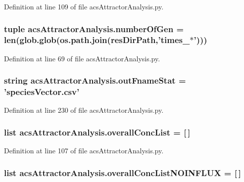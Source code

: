 Definition at line 109 of file acs\-Attractor\-Analysis.\-py.

\hypertarget{a00096_ac014a9b46a060e4fed96eaee9614345b}{
\subsubsection[{number\-Of\-Gen}]{\setlength{\rightskip}{0pt plus 5cm}tuple acs\-Attractor\-Analysis.\-number\-Of\-Gen = len(glob.\-glob(os.\-path.\-join({\bf res\-Dir\-Path},'times\-\_\-$\ast$')))}}\label{a00096_ac014a9b46a060e4fed96eaee9614345b}


Definition at line 69 of file acs\-Attractor\-Analysis.\-py.

\hypertarget{a00096_aeecfcdefbc44b2b2ceff4c9b6f737f27}{
\subsubsection[{out\-Fname\-Stat}]{\setlength{\rightskip}{0pt plus 5cm}string acs\-Attractor\-Analysis.\-out\-Fname\-Stat = 'species\-Vector.\-csv'}}\label{a00096_aeecfcdefbc44b2b2ceff4c9b6f737f27}


Definition at line 230 of file acs\-Attractor\-Analysis.\-py.

\hypertarget{a00096_aca1d14f4dbff06c02b0e3e362c7ffe14}{
\subsubsection[{overall\-Conc\-List}]{\setlength{\rightskip}{0pt plus 5cm}list acs\-Attractor\-Analysis.\-overall\-Conc\-List = \mbox{[}$\,$\mbox{]}}}\label{a00096_aca1d14f4dbff06c02b0e3e362c7ffe14}


Definition at line 107 of file acs\-Attractor\-Analysis.\-py.

\hypertarget{a00096_a62444c9b0d66deb07c2e1091695e7561}{
\subsubsection[{overall\-Conc\-List\-N\-O\-I\-N\-F\-L\-U\-X}]{\setlength{\rightskip}{0pt plus 5cm}list acs\-Attractor\-Analysis.\-overall\-Conc\-List\-N\-O\-I\-N\-F\-L\-U\-X = \mbox{[}$\,$\mbox{]}}}\label{a00096_a62444c9b0d66deb07c2e1091695e7561}


